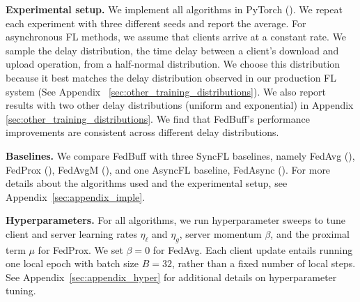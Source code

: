 \documentclass[twoside]{article}
\newcommand{\john}[1]{\todo[color=yellow!20,size=\footnotesize,inline,caption={}]{JN: #1}{}}
\newcommand{\kshitiz}[1]{\todo[color=red!20,size=\footnotesize,inline,caption={}]{KM: #1}{}}
\newcommand{\algname}{{FedBuff}\xspace}
\begin{document}


\textbf{Experimental setup.}
We implement all algorithms in PyTorch (\cite{pytorch}). We repeat each experiment with three different seeds and report the average. For asynchronous FL methods, we assume that clients arrive at a constant rate. We sample the delay distribution, the time delay between a client's download and upload operation, from a half-normal distribution. We choose this distribution because it best matches the delay distribution observed in our production FL system (See Appendix ~\ref{sec:other_training_distributions}). 
We also report results with two other delay distributions (uniform and exponential) in Appendix \ref{sec:other_training_distributions}. We find that \algname's performance improvements are consistent across different delay distributions. 


\textbf{Baselines.}
We compare \algname with three SyncFL baselines, namely FedAvg (\cite{google-fedavg}), FedProx (\cite{fedprox}), FedAvgM (\cite{fedavgm}), and one AsyncFL baseline, FedAsync (\cite{fedasync}). 
For more details about the algorithms used and the experimental setup, see Appendix~\ref{sec:appendix_imple}.

\textbf{Hyperparameters.}
\label{sec:hyperparameter}
For all algorithms, we run hyperparameter sweeps to tune client and server learning rates $\eta_{\ell}$ and $\eta_g$, server momentum $\beta$, and the proximal term $\mu$ for FedProx. We set $\beta = 0$ for FedAvg. Each client update entails running one local epoch with batch size $B = 32$, rather than a fixed number of local steps.
See Appendix~\ref{sec:appendix_hyper} for additional details on hyperparameter tuning.
\end{document}
